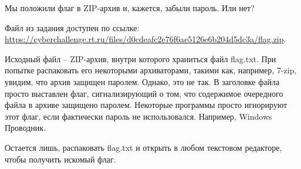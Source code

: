 
Мы положили флаг в ZIP-архив и, кажется, забыли пароль. Или нет?

Файл из задания доступен по ссылке: \url{https://cyberchallenge.rt.ru/files/d0cdeafc2e76f6ae5126e6b204d5dc3a/flag.zip}.

\solutionSection

Исходный файл – ZIP-архив, внутри которого храниться файл flag.txt. При попытке распаковать его некоторыми архиваторами, такими как, например, 7-zip, увидим, что архив защищен паролем. Однако, это не так. В заголовке файла просто выставлен флаг, сигнализирующий о том, что содержимое очередного файла в архиве защищено паролем. Некоторые программы просто игнорируют этот флаг, если фактически пароль не использовался. Например, Windows Проводник.


Остается лишь, распаковать flag.txt и открыть в любом текстовом редакторе, чтобы получить искомый флаг.

